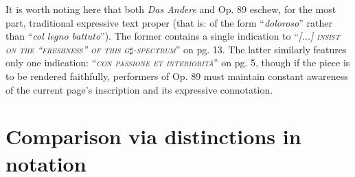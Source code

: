        It is worth noting here that both \textit{Das Andere} and Op. 89 eschew, for the most part, traditional expressive text proper (that is: of the form ``\textit{doloroso}'' rather than ``\textit{col legno battuto}''). The former contains a single indication to ``\textsc{\textit{[...] insist on the ``freshness'' of this g$\sharp$-spectrum}}'' on pg. 13. The latter similarly features only one indication: ``\textsc{\textit{con passione et interiorit\`{a}}}'' on pg. 5, though if the piece is to be rendered faithfully, performers of Op. 89 must maintain constant awareness of the current page's inscription and its expressive connotation. 
        
        
    
    
    
    
\section{Comparison via distinctions in notation}

    
